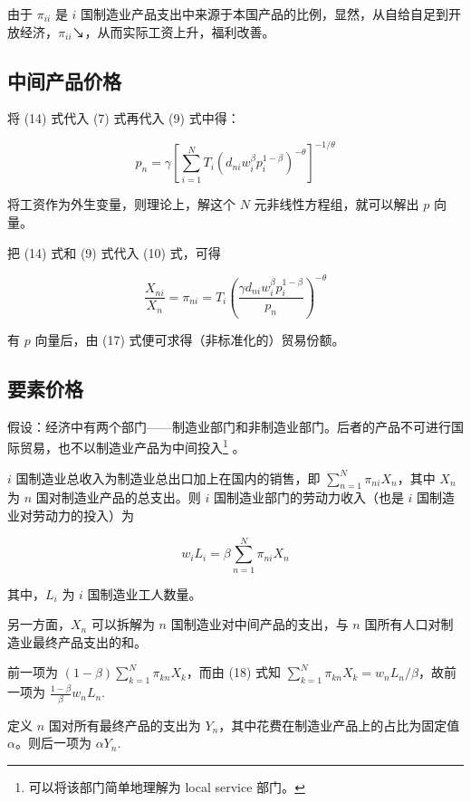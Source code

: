 \documentclass[
]{article}
\begin{document}
由于 \(\pi_{ii}\) 是 \(i\)
国制造业产品支出中来源于本国产品的比例，显然，从自给自足到开放经济，\(\pi_{ii}\)↘，从而实际工资上升，福利改善。

\hypertarget{input-price}{%
\subsection{中间产品价格}\label{input-price}}

将 (14) 式代入 (7) 式再代入 (9) 式中得：

\[
p_{n}=\gamma\left[\sum_{i=1}^{N} T_{i}\left(d_{n i} w_{i}^{\beta} p_{i}^{1-\beta}\right)^{-\theta}\right]^{-1 / \theta} \tag{16}
\]

将工资作为外生变量，则理论上，解这个 \(N\) 元非线性方程组，就可以解出 \(p\) 向量。

把 (14) 式和 (9) 式代入 (10) 式，可得

\[
\frac{X_{n i}}{X_{n}}=\pi_{n i}=T_{i}\left(\frac{\gamma d_{n i} w_{i}^{\beta} p_{i}^{1-\beta}}{p_{n}}\right)^{-\theta} \tag{17}
\]

有 \(p\) 向量后，由 (17) 式便可求得（非标准化的）贸易份额。

\hypertarget{factor-price}{%
\subsection{要素价格}\label{factor-price}}

假设：经济中有两个部门------制造业部门和非制造业部门。后者的产品不可进行国际贸易，也不以制造业产品为中间投入\footnote{可以将该部门简单地理解为 local service 部门。}
。

\(i\) 国制造业总收入为制造业总出口加上在国内的销售，即
\(\sum_{n=1}^{N} \pi_{n i} X_{n}\)，其中 \(X_n\) 为 \(n\)
国对制造业产品的总支出。则 \(i\) 国制造业部门的劳动力收入（也是 \(i\)
国制造业对劳动力的投入）为

\[
w_{i} L_{i}=\beta \sum_{n=1}^{N} \pi_{n i} X_{n} \tag{18}
\]

其中，\(L_i\) 为 \(i\) 国制造业工人数量。

另一方面，\(X_n\) 可以拆解为 \(n\) 国制造业对中间产品的支出，与 \(n\)
国所有人口对制造业最终产品支出的和。

前一项为 \((1-\beta)\sum_{k=1}^{N} \pi_{k n} X_{k}\)，而由 (18) 式知
\(\sum_{k=1}^{N} \pi_{k n} X_{k}=w_nL_n/\beta\)，故前一项为
\(\frac{1-\beta}{\beta} w_{n} L_{n}\).

定义 \(n\) 国对所有最终产品的支出为 \(Y_n\)，其中花费在制造业产品上的占比为固定值
\(\alpha\)。则后一项为 \(\alpha Y_{n}\).
\end{document}
